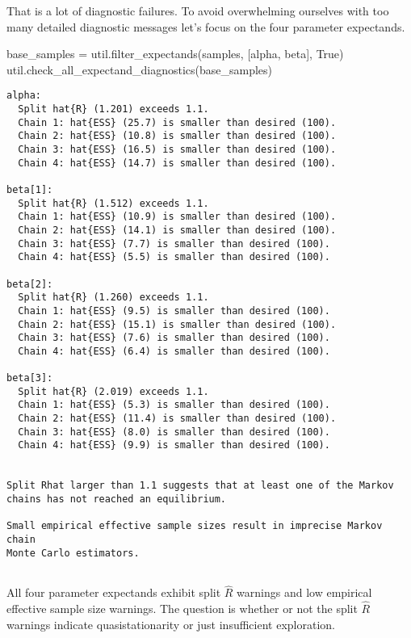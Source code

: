 \documentclass[
  letterpaper,
  DIV=11,
  numbers=noendperiod]{scrartcl}
\newenvironment{Shaded}{\begin{snugshade}}{\end{snugshade}}
\newcommand{\NormalTok}[1]{\textcolor[rgb]{0.00,0.23,0.31}{#1}}
\newcommand{\OperatorTok}[1]{\textcolor[rgb]{0.37,0.37,0.37}{#1}}
\newcommand{\StringTok}[1]{\textcolor[rgb]{0.13,0.47,0.30}{#1}}
\newcommand{\VariableTok}[1]{\textcolor[rgb]{0.07,0.07,0.07}{#1}}
\begin{document}
That is a lot of diagnostic failures. To avoid overwhelming ourselves
with too many detailed diagnostic messages let's focus on the four
parameter expectands.

\begin{Shaded}
\begin{Highlighting}[]
\NormalTok{base\_samples }\OperatorTok{=}\NormalTok{ util.filter\_expectands(samples, [}\StringTok{\textquotesingle{}alpha\textquotesingle{}}\NormalTok{, }\StringTok{\textquotesingle{}beta\textquotesingle{}}\NormalTok{], }\VariableTok{True}\NormalTok{)}
\NormalTok{util.check\_all\_expectand\_diagnostics(base\_samples)}
\end{Highlighting}
\end{Shaded}

\begin{verbatim}
alpha:
  Split hat{R} (1.201) exceeds 1.1.
  Chain 1: hat{ESS} (25.7) is smaller than desired (100).
  Chain 2: hat{ESS} (10.8) is smaller than desired (100).
  Chain 3: hat{ESS} (16.5) is smaller than desired (100).
  Chain 4: hat{ESS} (14.7) is smaller than desired (100).

beta[1]:
  Split hat{R} (1.512) exceeds 1.1.
  Chain 1: hat{ESS} (10.9) is smaller than desired (100).
  Chain 2: hat{ESS} (14.1) is smaller than desired (100).
  Chain 3: hat{ESS} (7.7) is smaller than desired (100).
  Chain 4: hat{ESS} (5.5) is smaller than desired (100).

beta[2]:
  Split hat{R} (1.260) exceeds 1.1.
  Chain 1: hat{ESS} (9.5) is smaller than desired (100).
  Chain 2: hat{ESS} (15.1) is smaller than desired (100).
  Chain 3: hat{ESS} (7.6) is smaller than desired (100).
  Chain 4: hat{ESS} (6.4) is smaller than desired (100).

beta[3]:
  Split hat{R} (2.019) exceeds 1.1.
  Chain 1: hat{ESS} (5.3) is smaller than desired (100).
  Chain 2: hat{ESS} (11.4) is smaller than desired (100).
  Chain 3: hat{ESS} (8.0) is smaller than desired (100).
  Chain 4: hat{ESS} (9.9) is smaller than desired (100).


Split Rhat larger than 1.1 suggests that at least one of the Markov
chains has not reached an equilibrium.
 
Small empirical effective sample sizes result in imprecise Markov chain
Monte Carlo estimators.
 
\end{verbatim}

All four parameter expectands exhibit split \(\hat{R}\) warnings and low
empirical effective sample size warnings. The question is whether or not
the split \(\hat{R}\) warnings indicate quasistationarity or just
insufficient exploration.
\end{document}
